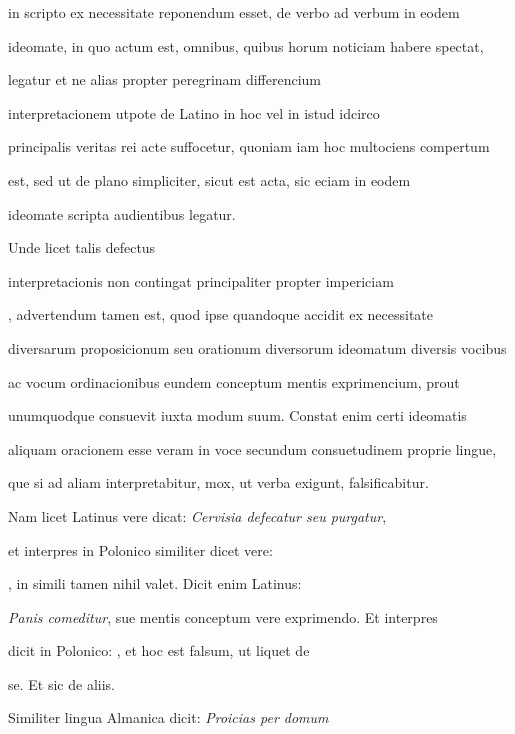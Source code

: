 in scripto ex necessitate reponendum esset, de verbo ad verbum in eodem

ideomate, in quo actum est, omnibus, quibus horum noticiam habere spectat,

 legatur et ne alias propter peregrinam differencium 

 interpretacionem utpote de Latino in hoc vel in istud idcirco

principalis veritas rei acte suffocetur, quoniam iam hoc multociens compertum

est, sed ut de plano simpliciter, sicut est acta, sic eciam in eodem

\splitlines{}

ideomate scripta audientibus legatur.

\indentK Unde licet talis defectus

\fulllines{}

interpretacionis non contingat principaliter propter impericiam 

, advertendum tamen est, quod ipse quandoque accidit ex necessitate

diversarum proposicionum seu orationum diversorum ideomatum diversis vocibus

ac vocum ordinacionibus eundem conceptum mentis exprimencium, prout

unumquodque consuevit iuxta modum suum. Constat enim certi ideomatis

aliquam oracionem esse veram in voce secundum consuetudinem proprie lingue,

que si ad aliam interpretabitur, mox, ut verba exigunt, falsificabitur.

\indentK Nam licet Latinus vere dicat: \textit{Cervisia defecatur seu purgatur}, 

et interpres in Polonico similiter dicet vere:   

   , in simili tamen nihil valet. Dicit enim Latinus:

\textit{Panis comeditur}, sue mentis conceptum vere exprimendo. Et interpres

dicit in Polonico:   , et hoc est falsum, ut liquet de

\splitlines{}

se. Et sic de aliis.

\indentK Similiter lingua Almanica dicit: \textit{Proicias per domum}


